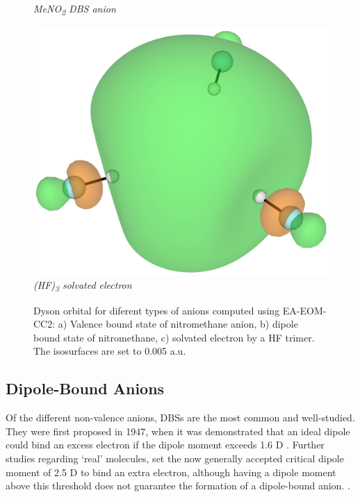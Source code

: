\begin{figure}[h]
\begin{minipage}[b]{0.30\textwidth}
    \small\emph{MeNO\textsubscript{2} DBS anion}
  \end{minipage}
  \hfill
  \begin{minipage}[b]{0.3\textwidth}
    \centering
    \includegraphics[width=1.1\textwidth]{chapters/introduction/image/hf3.png}
    \small\emph{(HF)\textsubscript{3} solvated electron}
  \end{minipage}
  \caption[Valence and Non-Valence Anions]{Dyson orbital for diferent types of anions computed using EA-EOM-CC2: a) Valence bound state of nitromethane anion, b) dipole bound state of nitromethane, c) solvated electron by a HF trimer. The isosurfaces are set to 0.005 a.u.}
  \label{fig:AnionTypes}
\end{figure}

\subsection{Dipole-Bound Anions}
Of the different non-valence anions, DBSs are the most common and well-studied. They were first proposed in 1947, when it was demonstrated that an ideal dipole could bind an excess electron if the dipole moment exceeds 1.6 D \cite{fermi1947capture}. Further studies regarding `real' molecules, set the now generally accepted critical dipole moment of 2.5 D to bind an extra electron, although having a dipole moment above this threshold does not guarantee the formation of a dipole-bound anion. \cite{jordan2003theory}.\\

